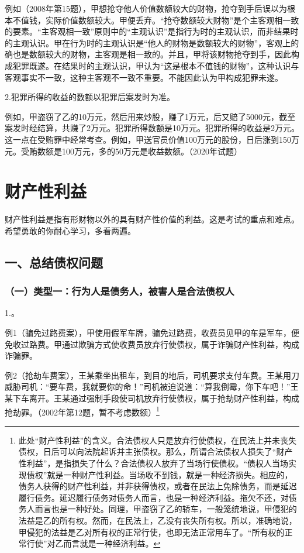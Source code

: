 例如（2008年第15题），甲想抢夺他人价值数额较大的财物，抢夺到手后误以为根本不值钱，实际价值数额较大。甲便丢弃。“抢夺数额较大财物”是个主客观相一致的要素。“主客观相一致”原则中的“主观认识”是指行为时的主观认识，而非结果时的主观认识。甲在行为时的主观认识是“他人的财物是数额较大的财物”，客观上的确也是数额较大的财物，主客观是相一致的。并且，甲将该财物抢夺到手，因此构成犯罪既遂。在结果时的主观认识，甲认为“这是根本不值钱的财物”，这种认识与客观事实不一致，这种主客观不一致不重要。不能因此认为甲构成犯罪未遂。

2.犯罪所得的收益的数额以犯罪后案发时为准。

例如，甲盗窃了乙的10万元，然后用来炒股，赚了1万元，后又赔了5000元，截至案发时经结算，共赚了2万元。犯罪所得数额是10万元。犯罪所得的收益是2万元。这一点在受贿罪中经常考查。例如，甲送官员价值100万元的股份，日后涨到150万元。受贿数额是100万元，多的50万元是收益数额。（2020年试题）

\section{财产性利益}

财产性利益是指有形财物以外的具有财产性价值的利益。这是考试的重点和难点。希望勇敢的你耐心学习，多看两遍。

\subsection*{一、总结债权问题}

\subsubsection*{（一）类型一：行为人是债务人，被害人是合法债权人}

1.。

例1（骗免过路费案），甲使用假军车牌，骗免过路费，收费员见甲的车是军车，便免收过路费。甲通过欺骗方式使收费员放弃行使债权，属于诈骗财产性利益，构成诈骗罪。

例2（抢劫车费案），王某乘坐出租车，到目的地后，司机要求支付车费。王某用刀威胁司机：“要车费，我就要你的命！”司机被迫说道：“算我倒霉，你下车吧！”王某下车离开。王某通过强制手段使司机放弃行使债权，属于抢劫财产性利益，构成抢劫罪。（2002年第12题，暂不考虑数额）\footnote{此处“财产性利益”的含义。合法债权人只是放弃行使债权，在民法上并未丧失债权，日后可以向法院起诉并主张债权。那么，所谓合法债权人损失了“财产性利益”，是指损失了什么？合法债权人放弃了当场行使债权。“债权人当场实现债权”就是一种财产性利益。当场收不到钱，就是一种经济损失。相应的，债务人获得的财产性利益，并非获得债权，或者在民法上免除债务，而是延迟履行债务。延迟履行债务对债务人而言，也是一种经济利益。拖欠不还，对债务人而言也是一种好处。同理，甲盗窃了乙的轿车，一般笼统地说，甲侵犯的法益是乙的所有权。然而，在民法上，乙没有丧失所有权。所以，准确地说，甲侵犯的法益是乙对所有权的正常行使，也即无法正常用车了。“所有权的正常行使”对乙而言就是一种经济利益。}


